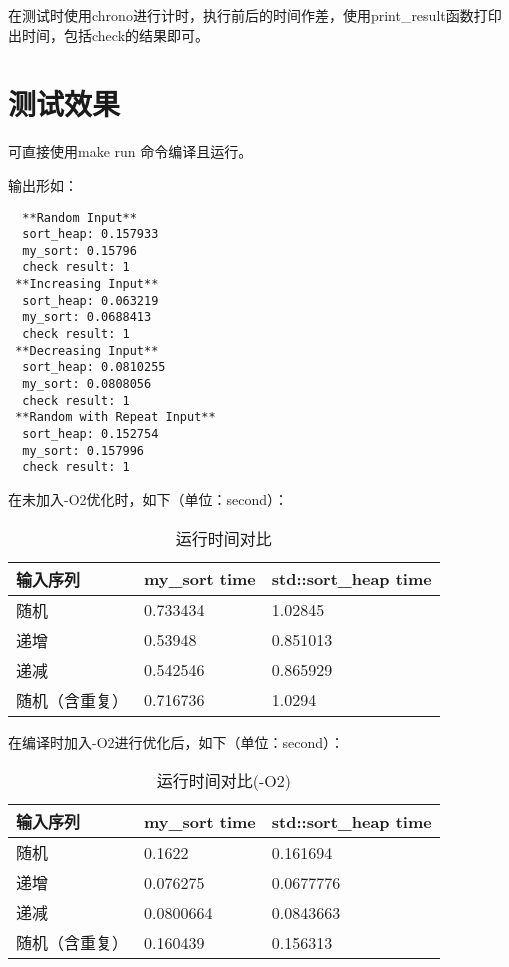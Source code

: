 \documentclass[UTF8]{ctexart}
\begin{document}
在测试时使用chrono进行计时，执行前后的时间作差，使用print\_result函数打印出时间，包括check的结果即可。

\section{测试效果}

可直接使用make run 命令编译且运行。

输出形如：
\begin{verbatim}
  **Random Input**
  sort_heap: 0.157933
  my_sort: 0.15796
  check result: 1
 **Increasing Input**
  sort_heap: 0.063219
  my_sort: 0.0688413
  check result: 1
 **Decreasing Input**
  sort_heap: 0.0810255
  my_sort: 0.0808056
  check result: 1
 **Random with Repeat Input**
  sort_heap: 0.152754
  my_sort: 0.157996
  check result: 1
\end{verbatim}

在未加入-O2优化时，如下（单位：second）：

\begin{table}[H]
  \begin{center}
  \caption{运行时间对比}
  \begin{tabular}{l|l|l}
  \label{table1}
  \textbf{输入序列} & \textbf{my\_sort time} & \textbf{std::sort\_heap time}\\
  \hline
  随机 & 0.733434 & 1.02845\\
  递增 & 0.53948 & 0.851013\\
  递减 & 0.542546 & 0.865929\\
  随机（含重复） & 0.716736 & 1.0294
  \end{tabular}
  \end{center}
\end{table}

在编译时加入-O2进行优化后，如下（单位：second）：

\begin{table}[H]
  \begin{center}
  \caption{运行时间对比(-O2)}
  \begin{tabular}{l|l|l}
  \textbf{输入序列} & \textbf{my\_sort time} & \textbf{std::sort\_heap time}\\
  \hline
  随机 & 0.1622 & 0.161694 \\
  递增 & 0.076275 & 0.0677776 \\
  递减 & 0.0800664 & 0.0843663 \\
  随机（含重复） & 0.160439 & 0.156313
  \end{tabular}
  \end{center}
\end{table}
\end{document}
